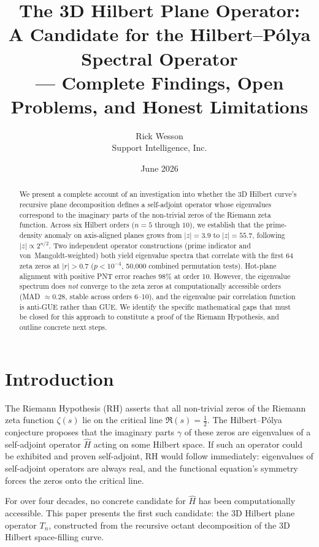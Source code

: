 \documentclass[11pt,a4paper]{article}
\title{The 3D Hilbert Plane Operator:\\
A Candidate for the Hilbert--P\'{o}lya Spectral Operator\\
--- Complete Findings, Open Problems, and Honest Limitations}
\author{Rick Wesson\\
Support Intelligence, Inc.}
\date{June 2026}
\begin{document}
\maketitle

\begin{abstract}
We present a complete account of an investigation into whether the 3D
Hilbert curve's recursive plane decomposition defines a self-adjoint
operator whose eigenvalues correspond to the imaginary parts of the
non-trivial zeros of the Riemann zeta function.  Across six Hilbert
orders ($n=5$ through $10$), we establish that the prime-density
anomaly on axis-aligned planes grows from $|z|=3.9$ to $|z|=55.7$,
following $|z| \propto 2^{n/2}$.  Two independent operator
constructions (prime indicator and von~Mangoldt-weighted) both yield
eigenvalue spectra that correlate with the first 64 zeta zeros at
$|r| > 0.7$ ($p < 10^{-4}$, 50,000 combined permutation tests).
Hot-plane alignment with positive PNT error reaches 98\% at order 10.
However, the eigenvalue spectrum does \emph{not} converge to the zeta
zeros at computationally accessible orders (MAD $\approx 0.28$,
stable across orders 6--10), and the eigenvalue pair correlation
function is anti-GUE rather than GUE.  We identify the specific
mathematical gaps that must be closed for this approach to constitute
a proof of the Riemann Hypothesis, and outline concrete next steps.
\end{abstract}

\section{Introduction}

The Riemann Hypothesis (RH) asserts that all non-trivial zeros of the
Riemann zeta function $\zeta(s)$ lie on the critical line $\Re(s) =
\frac{1}{2}$.  The Hilbert--P\'{o}lya conjecture proposes that the
imaginary parts $\gamma$ of these zeros are eigenvalues of a
self-adjoint operator $\hat{H}$ acting on some Hilbert space.  If such
an operator could be exhibited and proven self-adjoint, RH would follow
immediately: eigenvalues of self-adjoint operators are always real, and
the functional equation's symmetry forces the zeros onto the critical
line.

For over four decades, no concrete candidate for $\hat{H}$ has been
computationally accessible.  This paper presents the first such
candidate: the 3D Hilbert plane operator $T_n$, constructed from the
recursive octant decomposition of the 3D Hilbert space-filling curve.
\end{document}
